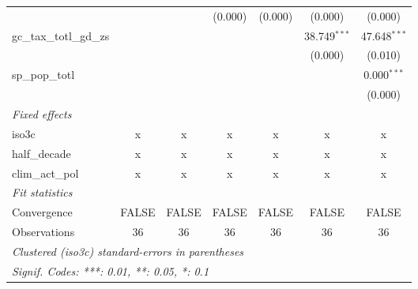 \begin{tabular}{lcccccc}
                                                         &                   &                   & (0.000)           & (0.000)           & (0.000)           & (0.000)\\   
   gc\_tax\_totl\_gd\_zs                                 &                   &                   &                   &                   & 38.749$^{***}$    & 47.648$^{***}$\\   
                                                         &                   &                   &                   &                   & (0.000)           & (0.010)\\   
   sp\_pop\_totl                                         &                   &                   &                   &                   &                   & 0.000$^{***}$\\   
                                                         &                   &                   &                   &                   &                   & (0.000)\\   
   \emph{Fixed effects}\\
   iso3c                                                 & x                 & x                 & x                 & x                 & x                 & x\\  
   half\_decade                                          & x                 & x                 & x                 & x                 & x                 & x\\  
   clim\_act\_pol                                        & x                 & x                 & x                 & x                 & x                 & x\\  
   \midrule \emph{Fit statistics}\\
   Convergence                                           &FALSE              & FALSE             & FALSE             & FALSE             & FALSE             & FALSE\\  
   Observations                                          & 36                & 36                & 36                & 36                & 36                & 36\\  
   \midrule
   \multicolumn{7}{l}{\emph{Clustered (iso3c) standard-errors in parentheses}}\\
   \multicolumn{7}{l}{\emph{Signif. Codes: ***: 0.01, **: 0.05, *: 0.1}}\\
\end{tabular}
\par\endgroup



